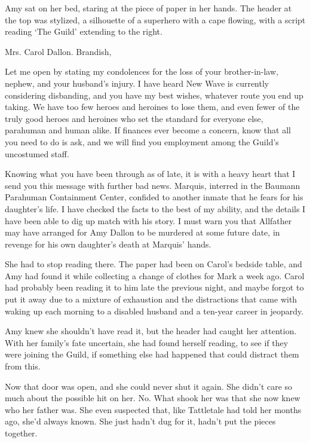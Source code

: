 





Amy sat on her bed, staring at the piece of paper in her hands.  The header at the top was stylized, a silhouette of a superhero with a cape flowing, with a script reading `The Guild' extending to the right.



Mrs. Carol Dallon.  Brandish,



Let me open by stating my condolences for the loss of your brother-in-law, nephew, and your husband's injury.  I have heard New Wave is currently considering disbanding, and you have my best wishes, whatever route you end up taking.  We have too few heroes and heroines to lose them, and even fewer of the truly good heroes and heroines who set the standard for everyone else, parahuman and human alike.  If finances ever become a concern, know that all you need to do is ask, and we will find you employment among the Guild's uncostumed staff.



Knowing what you have been through as of late, it is with a heavy heart that I send you this message with further bad news.  Marquis, interred in the Baumann Parahuman Containment Center, confided to another inmate that he fears for his daughter's life.  I have checked the facts to the best of my ability, and the details I have been able to dig up match with his story.  I must warn you that Allfather may have arranged for Amy Dallon to be murdered at some future date, in revenge for his own daughter's death at Marquis' hands.



She had to stop reading there.  The paper had been on Carol's bedside table, and Amy had found it while collecting a change of clothes for Mark a week ago.  Carol had probably been reading it to him late the previous night, and maybe forgot to put it away due to a mixture of exhaustion and the distractions that came with waking up each morning to a disabled husband and a ten-year career in jeopardy.



Amy knew she shouldn't have read it, but the header had caught her attention.  With her family's fate uncertain, she had found herself reading, to see if they were joining the Guild, if something else had happened that could distract them from this.



Now that door was open, and she could never shut it again.  She didn't care so much about the possible hit on her.  No.  What shook her was that she now knew who her father was.  She even suspected that, like Tattletale had told her months ago, she'd always known.  She just hadn't dug for it, hadn't put the pieces together.



